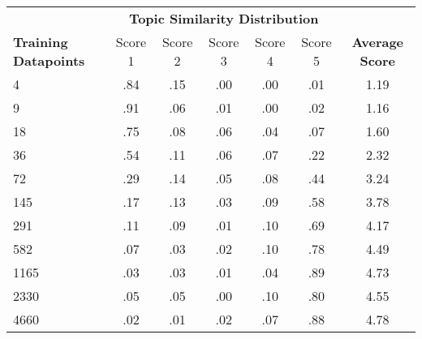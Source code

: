 \centering
\begin{tabular}{lcccccc}
\toprule
\multicolumn{1}{c}{} & \multicolumn{5}{c}{\textbf{Topic Similarity Distribution}} & \\
\cmidrule(lr){2-6}
\textbf{Training Datapoints} & Score 1 & Score 2 & Score 3 & Score 4 & Score 5 & \textbf{Average Score} \\
\midrule
4 & .84 & .15 & .00 & .00 & .01 & 1.19 \\
9 & .91 & .06 & .01 & .00 & .02 & 1.16 \\
18 & .75 & .08 & .06 & .04 & .07 & 1.60 \\
36 & .54 & .11 & .06 & .07 & .22 & 2.32 \\
72 & .29 & .14 & .05 & .08 & .44 & 3.24 \\
145 & .17 & .13 & .03 & .09 & .58 & 3.78 \\
291 & .11 & .09 & .01 & .10 & .69 & 4.17 \\
582 & .07 & .03 & .02 & .10 & .78 & 4.49 \\
1165 & .03 & .03 & .01 & .04 & .89 & 4.73 \\
2330 & .05 & .05 & .00 & .10 & .80 & 4.55 \\
4660 & .02 & .01 & .02 & .07 & .88 & 4.78 \\
\bottomrule
\end{tabular}
